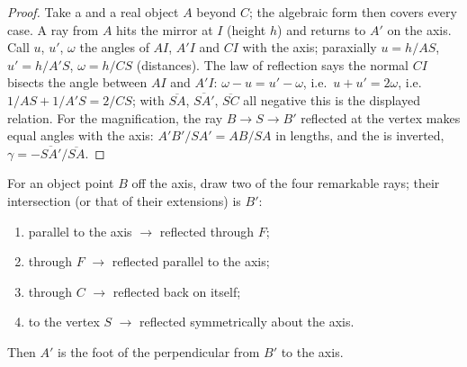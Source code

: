 \begin{proof}
Take a  and a real object $A$ beyond $C$; the algebraic
form then covers every case. A ray from $A$ hits the mirror at $I$
(height $h$) and returns to $A'$ on the axis. Call $u$, $u'$, $\omega$
the angles of $AI$, $A'I$ and $CI$ with the axis; paraxially
$u = h/AS$, $u' = h/A'S$, $\omega = h/CS$ (distances). The law of
reflection says the normal $CI$ bisects the angle between $AI$ and
$A'I$: $\omega - u = u' - \omega$, i.e.\ $u + u' = 2\omega$, i.e.\
$1/AS + 1/A'S = 2/CS$; with $\overline{SA}$, $\overline{SA'}$,
$\overline{SC}$ all negative this is the displayed relation. For the
magnification, the ray $B \to S \to B'$ reflected at the vertex makes
equal angles with the axis: $A'B'/SA' = AB/SA$ in lengths, and the 
is inverted, $\gamma = -\overline{SA'}/\overline{SA}$.
\end{proof}

\begin{method}\label{met:b1:mirrors-thin-lenses:mirrorrays}
For an object point $B$ off the axis, draw two of the four remarkable
rays; their intersection (or that of their extensions) is $B'$:
\begin{enumerate}
  \item parallel to the axis $\to$ reflected through $F$;
  \item through $F$ $\to$ reflected parallel to the axis;
  \item through $C$ $\to$ reflected back on itself;
  \item to the vertex $S$ $\to$ reflected symmetrically about the axis.
\end{enumerate}
Then $A'$ is the foot of the perpendicular from $B'$ to the axis.
\end{method}

